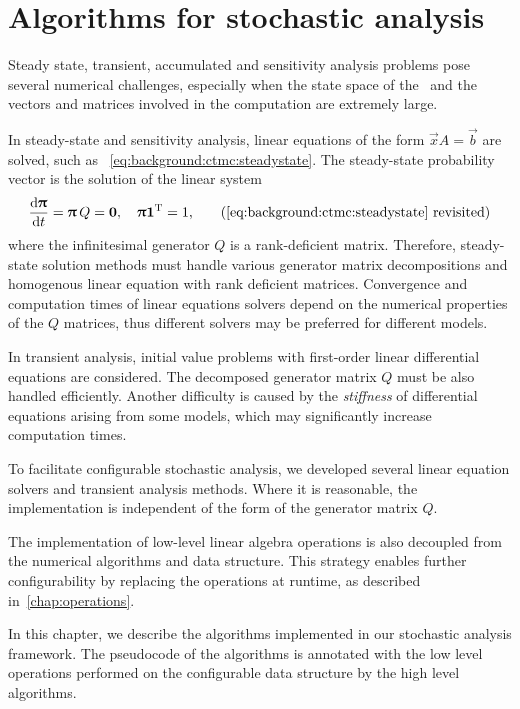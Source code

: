 \chapter{Algorithms for stochastic analysis}
\label{chap:algorithms}

Steady state, transient, accumulated and sensitivity analysis problems
pose several numerical challenges, especially when the state space of
the \CTMC\ and the vectors and matrices involved in the computation are
extremely large.

In steady-state and sensitivity analysis, linear equations of the form
$\vec{x} A = \vec{b}$ are solved, such as%
~\vref{eq:background:ctmc:steadystate}. The
steady-state probability vector is the solution of the linear system
\begin{equation}
  \frac{\dd \vec{\uppi}}{\dd t} = \vec{\uppi} \, Q = \vec{0},
  \quad \vec{\uppi} \vec{1}^\T = 1 \text,
  \tag{\ref{eq:background:ctmc:steadystate}~revisited}
\end{equation}
where the infinitesimal generator $Q$ is a rank-deficient
matrix. Therefore, steady-state solution methods must handle various
generator matrix decompositions and homogenous linear equation with
rank deficient matrices. Convergence and computation times of linear
equations solvers depend on the numerical properties of the $Q$
matrices, thus different solvers may be preferred for different
models.

In transient analysis, initial value problems with first-order linear
differential equations are considered. The decomposed generator matrix
$Q$ must be also handled efficiently. Another difficulty is caused by
the \emph{stiffness} of differential equations arising from some
models, which may significantly increase computation times.

To facilitate configurable stochastic analysis, we developed several
linear equation solvers and transient analysis methods. Where it is
reasonable, the implementation is independent of the form of the
generator matrix $Q$.

The implementation of low-level linear algebra operations is also
decoupled from the numerical algorithms and data structure. This
strategy enables further configurability by replacing the operations
at runtime, as described in~\cref{chap:operations}.

In this chapter, we describe the algorithms implemented in our
stochastic analysis framework. The pseudocode of the algorithms is
annotated with the low level operations performed on the configurable
data structure by the high level algorithms.

